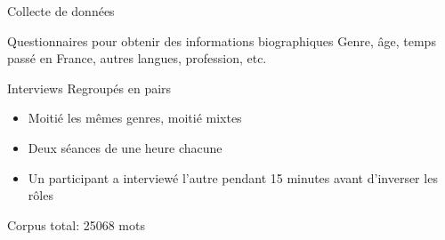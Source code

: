 \documentclass{beamer}
\begin{document}
    \begin{frame}{Collecte de données}
      \begin{block}{Questionnaires pour obtenir des informations biographiques}
        Genre, âge, temps passé en France, autres langues, profession, etc.
      \end{block}
      \begin{block}{Interviews}
        Regroupés en pairs
        \begin{itemize}
          \item Moitié les mêmes genres, moitié mixtes
          \item Deux séances de une heure chacune
          \item Un participant a interviewé l'autre pendant 15 minutes avant d'inverser les rôles
        \end{itemize}
      \end{block}
      \begin{block}{}
        Corpus total: 25068 mots
      \end{block}
    \end{frame}
\end{document}
